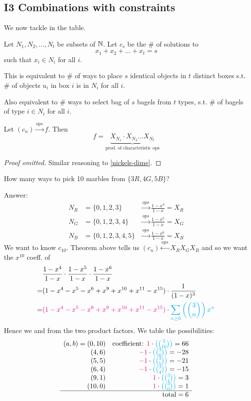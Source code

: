 \documentclass[12pt]{article}
\begin{document}
\subsection{I3 Combinations with constraints}
We now tackle  in the table.

\begin{theorem}
    Let $N_1,N_2,\dots,N_t$ be subsets of $\mathbb{N}$. Let $c_s$ be the \# of solutions to \[x_1+x_2+\dots+x_t=s\]
    such that $x_i\in N_i$ for all $i$.

    This is equivalent to \# of ways to place $s$ identical objects in $t$ distinct boxes s.t. \# of objects $u_i$ in box $i$ is in $N_i$ for all $i$.

    Also equivalent to \# ways to select bag of $s$ bagels from $t$ types, s.t. \# of bagels of type $i\in N_i$ for all $i$.

    Let $(c_n)\xrightarrow{ops}f$. Then \[f=\underbrace{X_{N_1}\cdot X_{N_2}\dots X_{N_t}}_{\text{prod. of characteristic ops}}\]
\end{theorem}
\begin{proof}[Proof omitted] Similar reasoning to \cref{nickels-dime}.
\end{proof}

\eg How many ways to pick 10 marbles from $\{3R,4G,5B\}$?

Answer: \begin{align*}
    N_R&= \{0,1,2,3\}&\xrightarrow{ops}\frac{1-x^4}{1-x}=X_R\\
    N_G&= \{0,1,2,3,4\}&\xrightarrow{ops}\frac{1-x^5}{1-x}=X_G\\
    N_B&= \{0,1,2,3,4,5\}&\xrightarrow{ops}\frac{1-x^6}{1-x}=X_B
\end{align*}
We want to know $c_{10}$. Theorem above tells us $(c_n)\xleftarrow{ops}X_RX_GX_B$ and so we want the $x^10$ coeff. of \begin{align*}
    &\frac{1-x^4}{1-x}\cdot \frac{1-x^5}{1-x}\cdot \frac{1-x^6}{1-x}\\
    =& (1-x^4-x^5-x^6+x^9+x^{10}+x^{11}-x^{15})\cdot \frac{1}{(1-x)^3}\\
    =& \textcolor{magenta}{(1-x^4-x^5-x^6+x^9+x^{10}+x^{11}-x^{15})}\cdot \textcolor{cyan}{\sum_{n\geq 0 }\left({3\choose n}\right)x^n}
\end{align*}
Hence we  and  from the two product factors. We table the possibilities:
\[\begin{array}{rr}
    (a,b) = (0,10) & \text{coefficient: }\textcolor{magenta}{1}\cdot \textcolor{cyan}{\left({3\choose 10}\right)} = 66\\
    (4,6) & \textcolor{magenta}{-1}\cdot \textcolor{cyan}{\left({ 3\choose 6}\right)}= -28\\
    (5,5) & \textcolor{magenta}{-1}\cdot \textcolor{cyan}{\left({ 3\choose 5}\right)}= -21\\
    (6,4) & \textcolor{magenta}{-1}\cdot \textcolor{cyan}{\left({ 3\choose 4}\right)}= -15\\
    (9,1) & \textcolor{magenta}{1}\cdot \textcolor{cyan}{\left({ 3\choose 1}\right)}= 3\\
    (10,0) & \textcolor{magenta}{1}\cdot \textcolor{cyan}{\left({ 3\choose 0}\right)}= 1\\
    \hline 
    & \text{total} = 6
\end{array}\]
\end{document}
